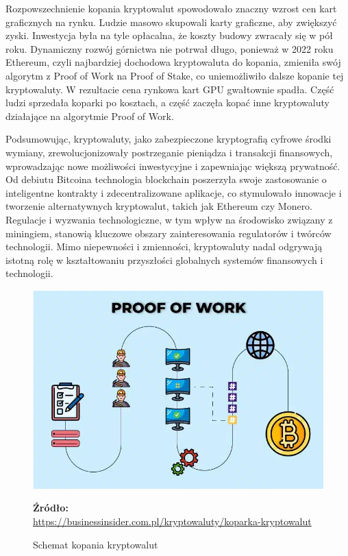 \documentclass[12pt,a4paper,twoside, inzynierska]{pwr_wmat_praca_dyplomowa}
\theoremstyle{plain}
\numberwithin{theorem}{chapter}
\theoremstyle{definition}
\numberwithin{theorem}{chapter}
\begin{document}
	Rozpowszechnienie kopania kryptowalut spowodowało znaczny wzrost cen kart graficznych na rynku. Ludzie masowo skupowali karty graficzne, aby zwiększyć zyski. Inwestycja była na tyle opłacalna, że koszty budowy zwracały się w pół roku. Dynamiczny rozwój górnictwa nie potrwał długo, ponieważ w 2022 roku Ethereum, czyli najbardziej dochodowa kryptowaluta do kopania, zmieniła swój algorytm z Proof of Work na Proof of Stake, co uniemożliwiło dalsze kopanie tej kryptowaluty. W rezultacie cena rynkowa kart GPU gwałtownie spadła. Część ludzi sprzedała koparki po kosztach, a część zaczęła kopać inne kryptowaluty działające na algorytmie Proof of Work.\par
	Podsumowując, kryptowaluty, jako zabezpieczone kryptografią cyfrowe środki wymiany, zrewolucjonizowały postrzeganie pieniądza i transakcji finansowych, wprowadzając nowe możliwości inwestycyjne i zapewniając większą prywatność. Od debiutu Bitcoina technologia blockchain poszerzyła swoje zastosowanie o inteligentne kontrakty i zdecentralizowane aplikacje, co stymulowało innowacje i tworzenie alternatywnych kryptowalut, takich jak Ethereum czy Monero. Regulacje i wyzwania technologiczne, w tym wpływ na środowisko związany z miningiem, stanowią kluczowe obszary zainteresowania regulatorów i twórców technologii. Mimo niepewności i zmienności, kryptowaluty nadal odgrywają istotną rolę w kształtowaniu przyszłości globalnych systemów finansowych i technologii.
	\vspace{12pt} %
	\begin{figure}[H]
		\centering
		\includegraphics[width=0.8\linewidth]{kopaniekrypto.png}
		\caption{Schemat kopania kryptowalut} %
		\label{fig:kopaniekrypto}
		\textbf{Źródło:} \\
		\url{https://businessinsider.com.pl/kryptowaluty/koparka-kryptowalut}
	\end{figure}
	\vspace{12pt} %
	
\end{document}
